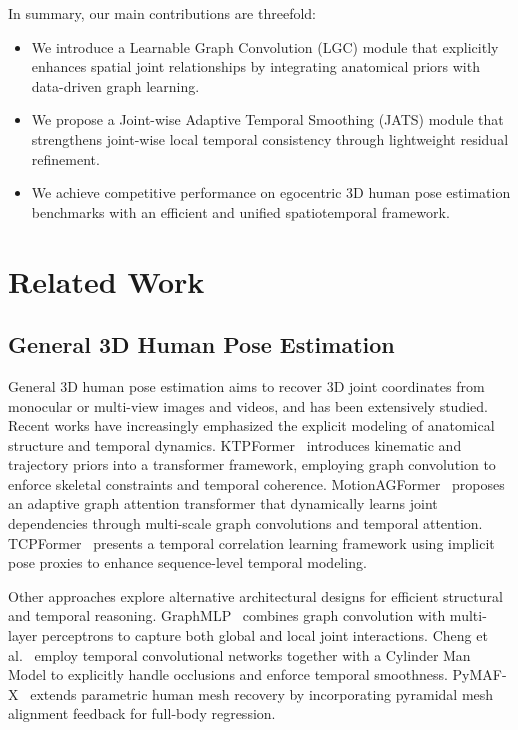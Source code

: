 \documentclass[conference]{IEEEtran}
\begin{document}
In summary, our main contributions are threefold:
\begin{itemize}
    \item We introduce a Learnable Graph Convolution (LGC) module that explicitly enhances spatial joint relationships by integrating anatomical priors with data-driven graph learning.
    \item We propose a Joint-wise Adaptive Temporal Smoothing (JATS) module that strengthens joint-wise local temporal consistency through lightweight residual refinement.
    \item We achieve competitive performance on egocentric 3D human pose estimation benchmarks with an efficient and unified spatiotemporal framework.
\end{itemize}


\section{Related Work}

\subsection{General 3D Human Pose Estimation}
General 3D human pose estimation aims to recover 3D joint coordinates from monocular or multi-view images and videos, and has been extensively studied. Recent works have increasingly emphasized the explicit modeling of anatomical structure and temporal dynamics. KTPFormer~\cite{b9} introduces kinematic and trajectory priors into a transformer framework, employing graph convolution to enforce skeletal constraints and temporal coherence. MotionAGFormer~\cite{b10} proposes an adaptive graph attention transformer that dynamically learns joint dependencies through multi-scale graph convolutions and temporal attention. TCPFormer~\cite{b11} presents a temporal correlation learning framework using implicit pose proxies to enhance sequence-level temporal modeling.

Other approaches explore alternative architectural designs for efficient structural and temporal reasoning. GraphMLP~\cite{b12} combines graph convolution with multi-layer perceptrons to capture both global and local joint interactions. Cheng et al.~\cite{b13} employ temporal convolutional networks together with a Cylinder Man Model to explicitly handle occlusions and enforce temporal smoothness. PyMAF-X~\cite{b14} extends parametric human mesh recovery by incorporating pyramidal mesh alignment feedback for full-body regression.
\end{document}
